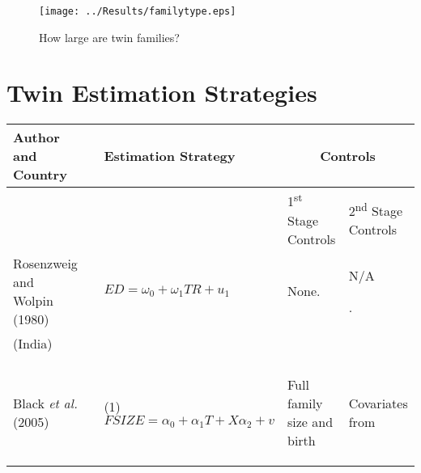 \documentclass{article}[11pt,subeqn]
\begin{document}
\begin{spacing}{1.5}
\begin{figure}[!htbp]
\caption{How large are twin families?}
\label{fig:familytype}
\begin{center}
\texttt{[image: ../Results/familytype.eps]}
\end{center}
\end{figure}

\section{Twin Estimation Strategies}
\label{scn:litrev}

\vspace{19.8cm}	

\begin{center}
\begin{rotate}{90}
\begin{tabular}{lp{4mm}lll}\toprule
Author and Country& &  Estimation Strategy & \multicolumn{2}{c}{Controls} \\ \midrule
&& & \hspace{5mm}1\textsuperscript{st} Stage Controls & 2\textsuperscript{nd} Stage Controls \\  \cmidrule(r){4-4} \cmidrule{5-5}
Rosenzweig and Wolpin (1980) & &
$ED=\omega_0+\omega_1 TR+u_1$&
\begin{small}None.\end{small}&
\begin{small}N\slash A\end{small}.
\\
(India) & & & &
\\
\begin{footnotesize}\end{footnotesize}&\begin{footnotesize}\end{footnotesize}&\begin{footnotesize}\end{footnotesize}&\begin{footnotesize}\end{footnotesize}&\begin{footnotesize}\end{footnotesize}\\
Black \emph{et al.} (2005) & &
(1) $FSIZE=\alpha_0 + \alpha_1 T + X\alpha_2 + v$ &
\begin{small}Full family size and  birth \end{small}&
\begin{small}Covariates from\end{small}

\end{tabular}
\end{rotate}
\end{center}
\end{spacing}
\end{document}
